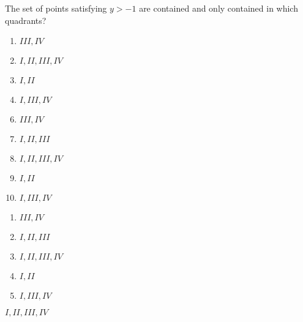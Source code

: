 

 The set of points satisfying $y>-1$ are contained and only contained in which quadrants?


\ifsat
	\begin{enumerate}[label=\Alph*)]
		\item   $III, IV$ 
		\item  $I, II, III, IV$ %
		\item  $I,II$
		\item  $I, III, IV$
	\end{enumerate}
\else
\fi

\ifacteven
	\begin{enumerate}[label=\textbf{\Alph*.},itemsep=\fill,align=left]
		\setcounter{enumii}{5}
		\item   $III, IV$ 
		\item  $I, II, III$
		\item  $I, II, III, IV$ %
		\addtocounter{enumii}{1}
		\item  $I,II$
		\item  $I, III, IV$
	\end{enumerate}
\else
\fi

\ifactodd
	\begin{enumerate}[label=\textbf{\Alph*.},itemsep=\fill,align=left]
		\item   $III, IV$ 
		\item  $I, II, III$
		\item  $I, II, III, IV$ %
		\item  $I,II$
		\item  $I, III, IV$
	\end{enumerate}
\else
\fi

\ifgridin
  $I, II, III, IV$ %
		
\else
\fi

